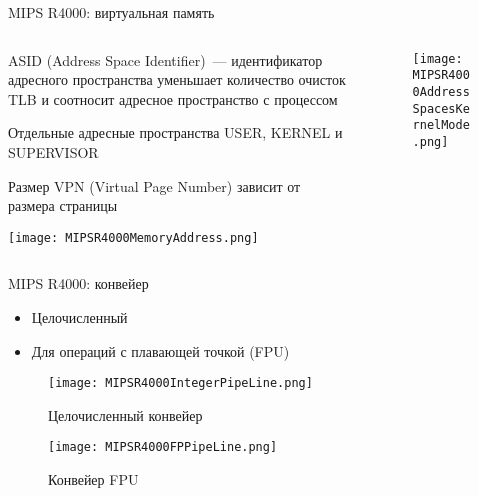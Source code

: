 \documentclass[aspectratio=169,14pt]{beamer}
\begin{document}
\begin{frame}{MIPS R4000: виртуальная память}
    \begin{columns}
        \begin{column}{0.55\textwidth}
            \begin{itemize}
                \begin{footnotesize}
                \begin{spacing}{0.9}
                \item ASID (Address Space Identifier)~--- идентификатор адресного пространства уменьшает количество очисток TLB и соотносит адресное пространство с процессом
                \item Отдельные адресные пространства USER, KERNEL и SUPERVISOR
                \item Размер VPN (Virtual Page Number) зависит от размера страницы
                \end{spacing}
                \end{footnotesize}

                \texttt{[image: MIPSR4000MemoryAddress.png]}
            \end{itemize}
        \end{column}
        \begin{column}{0.45\textwidth}
            \begin{figure}[c]
                \texttt{[image: MIPSR4000AddressSpacesKernelMode.png]}
            \end{figure}
        \end{column}
    \end{columns}
\end{frame}

\begin{frame}{MIPS R4000: конвейер}
    \begin{itemize}
        \item Целочисленный
        \item Для операций с плавающей точкой (FPU)
    \end{itemize}

    \begin{figure}[c]
        \centering
        \texttt{[image: MIPSR4000IntegerPipeLine.png]}
        \caption{\footnotesize{Целочисленный конвейер}}
    \end{figure}

    \begin{figure}[c]
        \centering
        \texttt{[image: MIPSR4000FPPipeLine.png]}
        \caption{\footnotesize{Конвейер FPU}}
    \end{figure}
\end{frame}
\end{document}
